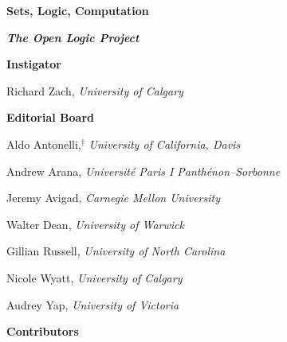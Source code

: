 %

\preto{}

\problemsperchapter

\frontmatter


\pagestyle{empty}

\vspace*{100pt}

\begin{raggedleft}
{\fontsize{24pt}{24pt}\selectfont\bfseries\sffamily%
  Sets, Logic, Computation}
\end{raggedleft}


\newpage


\vspace*{100pt}

{\bfseries\itshape The Open Logic Project}

\bigskip

\textbf{\color{leadbeater}Instigator}

\medskip

Richard Zach, \emph{University of Calgary}

\bigskip

\textbf{\color{leadbeater}Editorial Board}

\medskip

Aldo Antonelli,$^\dagger$ \emph{University of California, Davis}

Andrew Arana, \emph{Universit\'e Paris I Panth\'enon--Sorbonne}

Jeremy Avigad, \emph{Carnegie Mellon University}

Walter Dean, \emph{University of Warwick}

Gillian Russell, \emph{University of North Carolina}

Nicole Wyatt, \emph{University of Calgary}

Audrey Yap, \emph{University of Victoria}

\bigskip

\textbf{\color{leadbeater}Contributors}

\medskip

